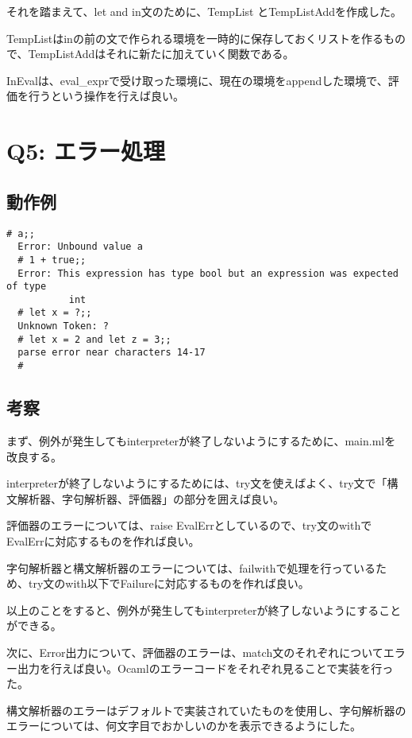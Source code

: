 \documentclass[uplatex,12pt]{jsarticle}
\begin{document}
それを踏まえて、let and in文のために、TempList とTempListAddを作成した。

TempListはinの前の文で作られる環境を一時的に保存しておくリストを作るもので、TempListAddはそれに新たに加えていく関数である。

InEvalは、eval\_exprで受け取った環境に、現在の環境をappendした環境で、評価を行うという操作を行えば良い。

\vspace{12pt}

\section{Q5: エラー処理}
\subsection{動作例}
\begin{lstlisting}[caption=動作例]
  # a;;
  Error: Unbound value a
  # 1 + true;;
  Error: This expression has type bool but an expression was expected of type
           int
  # let x = ?;;
  Unknown Token: ?
  # let x = 2 and let z = 3;;
  parse error near characters 14-17
  #

\end{lstlisting}

\subsection{考察}
まず、例外が発生してもinterpreterが終了しないようにするために、main.mlを改良する。

interpreterが終了しないようにするためには、try文を使えばよく、try文で「構文解析器、字句解析器、評価器」の部分を囲えば良い。

評価器のエラーについては、raise EvalErrとしているので、try文のwithでEvalErrに対応するものを作れば良い。

字句解析器と構文解析器のエラーについては、failwithで処理を行っているため、try文のwith以下でFailureに対応するものを作れば良い。

以上のことをすると、例外が発生してもinterpreterが終了しないようにすることができる。

\vspace{12pt}

次に、Error出力について、評価器のエラーは、match文のそれぞれについてエラー出力を行えば良い。Ocamlのエラーコードをそれぞれ見ることで実装を行った。

構文解析器のエラーはデフォルトで実装されていたものを使用し、字句解析器のエラーについては、何文字目でおかしいのかを表示できるようにした。
\end{document}
